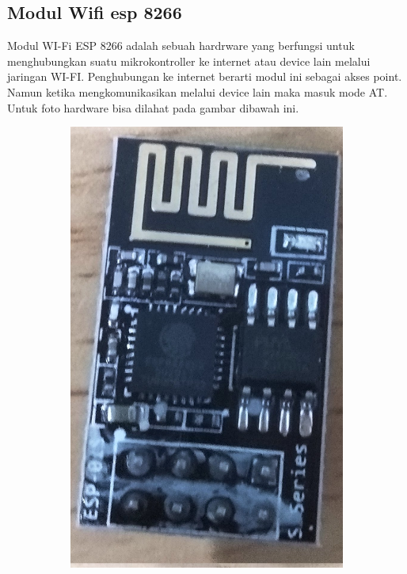 \documentclass[11pt]{article}
\begin{document}
\subsection{Modul Wifi esp 8266}
Modul WI-Fi ESP 8266 adalah sebuah hardrware yang berfungsi untuk menghubungkan suatu mikrokontroller ke internet atau device lain melalui jaringan WI-FI.
Penghubungan ke internet berarti modul ini sebagai akses point.
Namun ketika mengkomunikasikan melalui device lain maka masuk mode AT.
Untuk foto hardware bisa dilahat pada gambar dibawah ini.
\begin{figure}[h!]
	\centering
	\begin{subfigure}[b]{0.39\linewidth}
		\includegraphics[width=\linewidth]{dokumentasi/ESP8266/wifi2.jpg}

\end{subfigure}
\end{figure}
\end{document}
